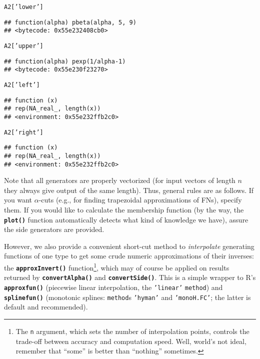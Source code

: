 \documentclass[11pt]{article}\usepackage[]{graphicx}\usepackage[]{color}
\makeatletter
\newcommand{\hlstr}[1]{\textcolor[rgb]{0.192,0.494,0.8}{#1}}%
\newcommand{\hlstd}[1]{\textcolor[rgb]{0.345,0.345,0.345}{#1}}%
\newcommand{\hlkwc}[1]{\textcolor[rgb]{0.333,0.667,0.333}{#1}}%
\newcommand{\hlkwd}[1]{\textcolor[rgb]{0.737,0.353,0.396}{\textbf{#1}}}%
\newenvironment{kframe}{%
 \def\at@end@of@kframe{}%
 \ifinner\ifhmode%
  \def\at@end@of@kframe{\end{minipage}}%
  \begin{minipage}{\columnwidth}%
 \fi\fi%
 \def\FrameCommand##1{\hskip\@totalleftmargin \hskip-\fboxsep
 \colorbox{shadecolor}{##1}\hskip-\fboxsep
     \hskip-\linewidth \hskip-\@totalleftmargin \hskip\columnwidth}%
 \MakeFramed {\advance\hsize-\width
   \@totalleftmargin\z@ \linewidth\hsize
   \@setminipage}}%
 {\par\unskip\endMakeFramed%
 \at@end@of@kframe}
\newenvironment{knitrout}{}{} %
\newcommand{\lang}[1]{\textsf{#1}\xspace}
\newcommand{\R}{\lang{R}}
\newcommand{\func}[1]{\texttt{\hlkwd{#1}}}
\newcommand{\argument}[1]{\texttt{\hlkwc{#1}}}
\newcommand{\str}[1]{\texttt{\hlstr{#1}}}
\makeatother
\begin{document}
\begin{knitrout}\small
{}\color{fgcolor}\begin{kframe}
\begin{alltt}
\hlstd{A2[}\hlstr{'lower'}\hlstd{]}
\end{alltt}
\begin{verbatim}
## function(alpha) pbeta(alpha, 5, 9)
## <bytecode: 0x55e232408cb0>
\end{verbatim}
\begin{alltt}
\hlstd{A2[}\hlstr{'upper'}\hlstd{]}
\end{alltt}
\begin{verbatim}
## function(alpha) pexp(1/alpha-1)
## <bytecode: 0x55e230f23270>
\end{verbatim}
\begin{alltt}
\hlstd{A2[}\hlstr{'left'}\hlstd{]}
\end{alltt}
\begin{verbatim}
## function (x) 
## rep(NA_real_, length(x))
## <environment: 0x55e232ffb2c0>
\end{verbatim}
\begin{alltt}
\hlstd{A2[}\hlstr{'right'}\hlstd{]}
\end{alltt}
\begin{verbatim}
## function (x) 
## rep(NA_real_, length(x))
## <environment: 0x55e232ffb2c0>
\end{verbatim}
\end{kframe}
\end{knitrout}

\noindent
Note that all generators are properly vectorized (for
input vectors of length $n$ they always give output of the
same length).
Thus, general rules are as follows.
If you want $\alpha$-cuts (e.g., for finding
trapezoidal approximations of FNs), specify them.
If you would like to calculate the membership function (by the way,
the \func{plot()} function
automatically detects what kind of knowledge we have),
assure the side generators are provided.


However, we also provide a convenient short-cut method
to \textit{interpolate} generating functions of one type
to get some crude numeric approximations of their inverses:
the \func{approxInvert()}
function\footnote{The
\argument{n} argument, which sets the number of interpolation points,
controls the trade-off between accuracy and computation speed.
Well, world's not ideal, remember that ``some'' is better than ``nothing''
sometimes.}, which may
of course be applied on results returned by
\func{convertAlpha()}
and \func{convertSide()}.
This is a simple wrapper to \R's \func{approxfun()}
(piecewise linear interpolation,
the \str{'{}linear'{}} \argument{method})
and \func{splinefun()} (monotonic
splines: \argument{method}s \str{'{}hyman{}'}
and \str{'{}monoH.FC'{}}; the latter is
default and recommended).
\end{document}
